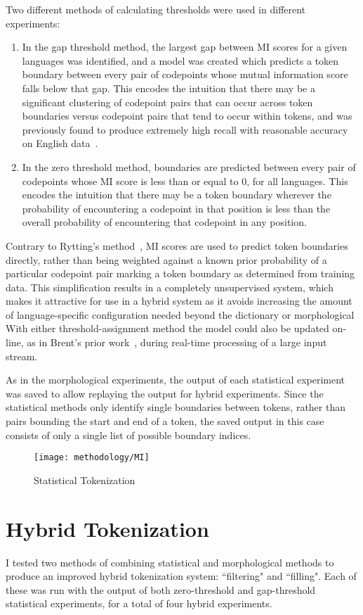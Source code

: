 Two different methods of calculating thresholds were used in different experiments:
\begin{enumerate}
	\item In the gap threshold method, the largest gap between MI scores for a given languages was identified, and a model was created which predicts a token boundary between every pair of codepoints whose mutual information score falls below that gap. This encodes the intuition that there may be a significant clustering of codepoint pairs that can occur across token boundaries versus codepoint pairs that tend to occur within tokens, and was previously found to produce extremely high recall with reasonable accuracy on English data~\cite{kearsley14}.
	\item In the zero threshold method, boundaries are predicted between every pair of codepoints whose MI score is less than or equal to 0, for all languages. This encodes the intuition that there may be a token boundary wherever the probability of encountering a codepoint in that position is less than the overall probability of encountering that codepoint in any position.
\end{enumerate}
Contrary to Rytting's method~\cite{rytting04}, MI scores are used to predict token boundaries directly, rather than being weighted against a known prior probability of a particular codepoint pair marking a token boundary as determined from training data. This simplification results in a completely unsupervised system, which makes it attractive for use in a hybrid system as it avoids increasing the amount of language-specific configuration needed beyond the dictionary or morphological With either threshold-assignment method the model could also be updated on-line, as in Brent's prior work~\cite{brent99}, during real-time processing of a large input stream.

As in the morphological experiments, the output of each statistical experiment was saved to allow replaying the output for hybrid experiments. Since the statistical methods only identify single boundaries between tokens, rather than pairs bounding the start and end of a token, the saved output in this case consists of only a single list of possible boundary indices.

\begin{figure}
	\texttt{[image: methodology/MI]}
	\caption{Statistical Tokenization}
	\label{statdiagram}
\end{figure}

\section{Hybrid Tokenization}
I tested two methods of combining statistical and morphological methods to produce an improved hybrid tokenization system: ``filtering" and ``filling". Each of these was run with the output of both zero-threshold and gap-threshold statistical experiments, for a total of four hybrid experiments.

